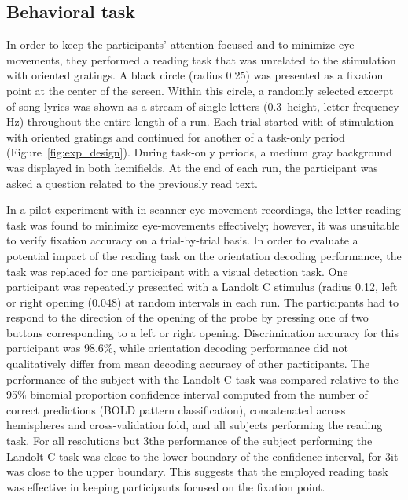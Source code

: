 \subsection*{Behavioral task}

\noindent In order to keep the participants' attention focused and to minimize
eye-movements, they performed a reading task that was unrelated to the
stimulation with oriented gratings. A black circle (radius 0.25\textdegree) was
presented as a fixation point at the center of the screen. Within this circle,
a randomly selected excerpt of song lyrics was shown as a stream of single letters
(0.3\textdegree\ height, letter frequency \unit[2]{Hz}) throughout the entire
length of a run. Each trial started with  of stimulation with
oriented gratings and continued for another  of a task-only period
(Figure~\ref{fig:exp_design}). During task-only periods, a medium gray
background was displayed in both hemifields. At the end of each run, the
participant was asked a question related to the previously read text.

In a pilot experiment with in-scanner eye-movement recordings, the letter
reading task was found to minimize eye-movements effectively; however, it was
unsuitable to verify fixation accuracy on a trial-by-trial basis. In order to
evaluate a potential impact of the reading task on the orientation decoding
performance, the task was replaced for one participant with a visual detection
task. One participant was repeatedly presented with a Landolt C stimulus
(radius 0.12\textdegree, left or right opening (0.048\textdegree) at random
intervals in each run. The participants had to respond to the direction of the
opening of the probe by pressing one of two buttons corresponding to a left or
right opening. Discrimination accuracy for this participant was 98.6\%, while
orientation decoding performance did not qualitatively differ from mean
decoding accuracy of other participants. The performance of the subject with the Landolt C 
task was compared relative to the 95\% binomial proportion 
confidence interval computed from the number of correct predictions (BOLD pattern classification), 
concatenated across hemispheres and cross-validation fold, and all subjects performing the 
reading task. For all resolutions but 3\mm the performance of the subject 
performing the Landolt C task was close to the lower boundary of the 
confidence interval, for 3\mm it was close to the upper boundary. This suggests that the
employed reading task was effective in keeping participants focused on the
fixation point.

